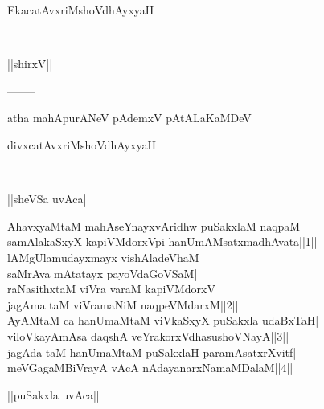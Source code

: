 \documentclass{article}
\begin{document}
\begin{center}
EkacatAvxriMshoVdhAyxyaH
\end{center}

\begin{center}
---------------
\end{center}

\begin{center}
||shirxV||
\end{center}

\begin{center}
--------
\end{center}

\begin{center}
atha mahApurANeV pAdemxV pAtALaKaMDeV
\end{center}

\begin{center}
divxcatAvxriMshoVdhAyxyaH
\end{center}

\begin{center}
---------------
\end{center}

\begin{center}
||sheVSa uvAca||
\end{center}

AhavxyaMtaM mahAseYnayxvAridhw puSakxlaM naqpaM\\
samAlakaSxyX kapiVMdorxVpi hanUmAMsatxmadhAvata||1||\\
lAMgUlamudayxmayx vishAladeVhaM\\
saMrAva mAtatayx payoVdaGoVSaM|\\
raNasithxtaM viVra varaM kapiVMdorxV\\
jagAma taM viVramaNiM naqpeVMdarxM||2||\\
AyAMtaM ca hanUmaMtaM viVkaSxyX puSakxla udaBxTaH|\\
viloVkayAmAsa daqshA veYrakorxVdhasushoVNayA||3||\\
jagAda taM hanUmaMtaM puSakxlaH paramAsatxrXvitf|\\
meVGagaMBiVrayA vAcA nAdayanarxNamaMDalaM||4||\\

\begin{center}
||puSakxla uvAca||
\end{center}
\end{document}
